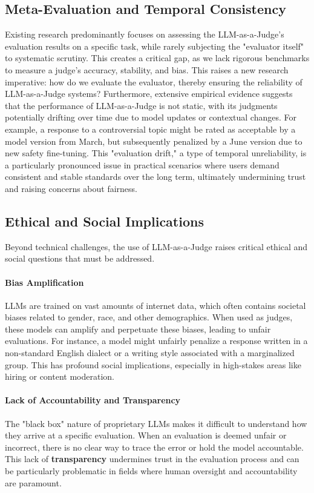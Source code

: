 \subsection{Meta-Evaluation and Temporal Consistency}\label{subsec:challenges_meta_eval}

Existing research predominantly focuses on assessing the LLM-as-a-Judge's evaluation results on a specific task, while rarely subjecting the "evaluator itself" to systematic scrutiny. This creates a critical gap, as we lack rigorous benchmarks to measure a judge's accuracy, stability, and bias. This raises a new research imperative: how do we evaluate the evaluator, thereby ensuring the reliability of LLM-as-a-Judge systems? Furthermore, extensive empirical evidence suggests that the performance of LLM-as-a-Judge is not static, with its judgments potentially drifting over time due to model updates or contextual changes. For example, a response to a controversial topic might be rated as acceptable by a model version from March, but subsequently penalized by a June version due to new safety fine-tuning. This "evaluation drift," a type of temporal unreliability, is a particularly pronounced issue in practical scenarios where users demand consistent and stable standards over the long term, ultimately undermining trust and raising concerns about fairness.




\subsection{Ethical and Social Implications}
Beyond technical challenges, the use of LLM-as-a-Judge raises critical ethical and social questions that must be addressed.

\paragraph{\textbf{Bias Amplification}}
LLMs are trained on vast amounts of internet data, which often contains societal biases related to gender, race, and other demographics. When used as judges, these models can amplify and perpetuate these biases, leading to unfair evaluations. For instance, a model might unfairly penalize a response written in a non-standard English dialect or a writing style associated with a marginalized group. This has profound social implications, especially in high-stakes areas like hiring or content moderation.

\paragraph{\textbf{Lack of Accountability and Transparency}}
The "black box" nature of proprietary LLMs makes it difficult to understand how they arrive at a specific evaluation. When an evaluation is deemed unfair or incorrect, there is no clear way to trace the error or hold the model accountable. This lack of \textbf{transparency} undermines trust in the evaluation process and can be particularly problematic in fields where human oversight and accountability are paramount.

